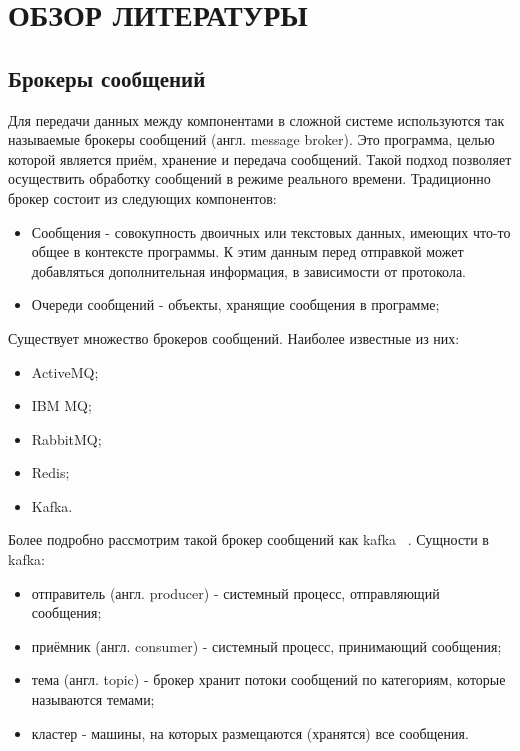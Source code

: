 \section{ОБЗОР ЛИТЕРАТУРЫ}
\label{sec:domain}

\subsection{Брокеры сообщений}

Для передачи данных между компонентами в сложной системе используются так называемые брокеры сообщений (англ. message broker).
Это программа, целью которой является приём, хранение и передача сообщений.
Такой подход позволяет осуществить обработку сообщений в режиме реального времени.
Традиционно брокер состоит из следующих компонентов:
\begin{itemize}
    \item Сообщения - совокупность двоичных или текстовых данных, имеющих что-то общее в контексте программы.
     К этим данным перед отправкой может добавляться дополнительная информация, в зависимости от протокола.
    \item Очереди сообщений - объекты, хранящие сообщения в программе;
\end{itemize}

Существует множество брокеров сообщений. Наиболее известные из них:
\begin{itemize}
    \item ActiveMQ;
    \item IBM MQ;
    \item RabbitMQ;
    \item Redis;
    \item Kafka.
\end{itemize}

Более подробно рассмотрим такой брокер сообщений как kafka ~\cite{kafka_documentation_intro}.
Сущности в kafka:

\begin{itemize}
    \item отправитель (англ. producer) - системный процесс, отправляющий сообщения;
    \item приёмник (англ. consumer) - системный процесс, принимающий сообщения;
    \item тема (англ. topic) - брокер хранит потоки сообщений по категориям, которые называются темами;
    \item кластер - машины, на которых размещаются (хранятся) все сообщения.
\end{itemize}

